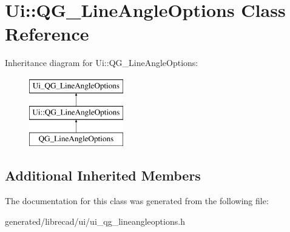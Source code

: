 \hypertarget{classUi_1_1QG__LineAngleOptions}{\section{Ui\-:\-:Q\-G\-\_\-\-Line\-Angle\-Options Class Reference}
\label{classUi_1_1QG__LineAngleOptions}
}
Inheritance diagram for Ui\-:\-:Q\-G\-\_\-\-Line\-Angle\-Options\-:\begin{figure}[H]
\begin{center}
\leavevmode
\includegraphics[height=3.000000cm]{classUi_1_1QG__LineAngleOptions}
\end{center}
\end{figure}
\subsection*{Additional Inherited Members}


The documentation for this class was generated from the following file\-:\begin{DoxyCompactItemize}
\item 
generated/librecad/ui/ui\-\_\-qg\-\_\-lineangleoptions.\-h\end{DoxyCompactItemize}

